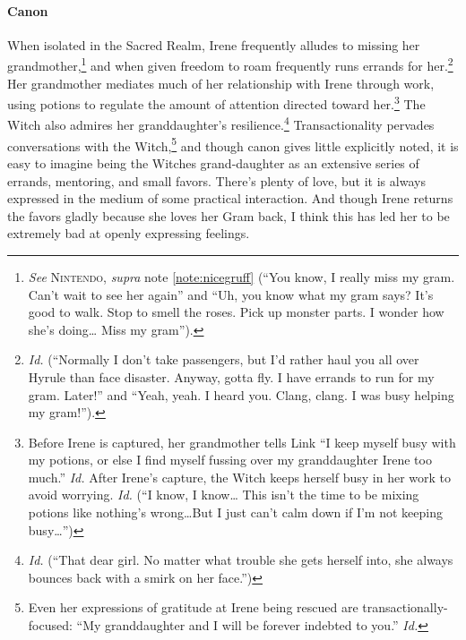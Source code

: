   \paragraph{Canon}\label{gram:canon} When isolated in the Sacred Realm, Irene frequently alludes to missing her grandmother,\footnote{\textit{See} \textsc{Nintendo}, \textit{supra} note \ref{note:nicegruff} (``You know, I really miss my gram. Can’t wait to see her again'' and ``Uh, you know what my gram says? It’s good to walk. Stop to smell the roses. Pick up monster parts. I wonder how she’s doing\ldots{} Miss my gram'').}
  and when given freedom to roam frequently runs errands for her.\footnote{\textit{Id.} (``Normally I don’t take passengers, but I’d rather haul you all over Hyrule than face disaster. Anyway, gotta fly. I have errands to run for my gram. Later!'' and ``Yeah, yeah. I heard you. Clang, clang. I was busy helping my gram!'').} Her grandmother mediates much of her relationship with Irene through work, using potions to regulate the amount of attention directed toward her.\footnote{Before Irene is captured, her grandmother tells Link ``I keep myself busy with my potions, or else I find myself fussing over my granddaughter Irene too much.'' \textit{Id.} After Irene's capture, the Witch keeps herself busy in her work to avoid worrying. \textit{Id.} (``I know, I know\ldots{} This isn’t the time to be mixing potions like nothing’s wrong\ldots But I just can’t calm down if I’m not keeping busy\ldots'')} The Witch also admires her granddaughter's resilience.\footnote{\textit{Id.} (``That dear girl. No matter what trouble she gets herself into, she always bounces back with a smirk on her face.'')} Transactionality pervades conversations with the Witch,\footnote{Even her expressions of gratitude at Irene being rescued are transactionally-focused: ``My granddaughter and I will be forever indebted to you.'' \textit{Id.}} and though canon gives little explicitly noted, it is easy to imagine being the Witches grand-daughter as an extensive series of errands, mentoring, and small favors. There's plenty of love, but it is always expressed in the medium of some practical interaction. And though Irene returns the favors gladly because she loves her Gram back, I think this has led her to be extremely bad at openly expressing feelings.

